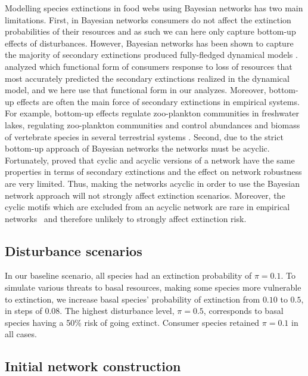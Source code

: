 \documentclass[12pt]{article}
\begin{document}
\begin{spacing}{2.0}
		Modelling species extinctions in food webs using Bayesian networks has two main limitations. 
		First, in Bayesian networks consumers do not affect the extinction probabilities of their resources and as such we can here only capture bottom-up effects of disturbances. 
		However, Bayesian networks has been shown to capture the majority of secondary extinctions produced fully-fledged dynamical models \citep{Eklof2013}.
		\cite{Eklof2013} analyzed which functional form of consumers response to loss of resources that most accurately predicted the secondary extinctions realized in the dynamical model, and we here use that functional form in our analyzes.  
		Moreover, bottom-up effects are often the main force of secondary extinctions in empirical systems. 
		For example, bottom-up effects regulate zoo-plankton communities in freshwater lakes, regulating zoo-plankton communities \citep{li2020bottom} and control abundances and biomass of vertebrate species in several terrestrial systems \citep{Dobson2009food, Mduma1999food, Georgiadis2007}. 
		Second, due to the strict bottom-up approach of Bayesian networks the networks must be acyclic.
		Fortunately, \cite{Allesina2009functional} proved that cyclic and acyclic versions of a network have the same properties in terms of secondary extinctions and the effect on network robustness are very limited. 
		Thus, making the networks acyclic in order to use the Bayesian network approach will not strongly affect extinction scenarios.
		Moreover, the cyclic motifs which are excluded from an acyclic network are rare in empirical networks~\citep{Stouffer2007} and therefore unlikely to strongly affect extinction risk.
	
		
    \subsection*{Disturbance scenarios}
    
        In our baseline scenario, all species had an extinction probability of $\pi = 0.1$. 
		To simulate various threats to basal resources, making some species more vulnerable to extinction, we increase basal species' probability of extinction from $0.10$ to $0.5$, in steps of $0.08$. 
		The highest disturbance level, $\pi = 0.5$, corresponds to basal species having a 50\% risk of going extinct. 
		Consumer species retained $\pi=0.1$ in all cases.
		
		
	\subsection*{Initial network construction}


\end{spacing}
\end{document}
